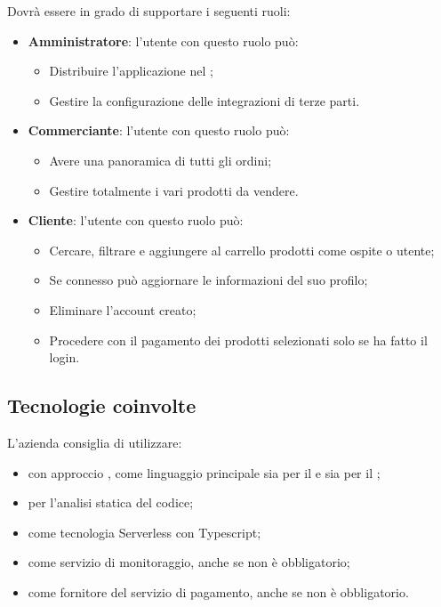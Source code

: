 Dovrà essere in grado di supportare i seguenti ruoli:
\begin{itemize}
	\item \textbf{Amministratore}: l'utente con questo ruolo può:
		\begin{itemize}
			\item Distribuire l'applicazione nel ;
			\item Gestire la configurazione delle integrazioni di terze parti.
		\end{itemize}
	\item \textbf{Commerciante}: l'utente con questo ruolo può:
		\begin{itemize}
			\item Avere una panoramica di tutti gli ordini;
			\item Gestire totalmente i vari prodotti da vendere.
		\end{itemize}
	\item \textbf{Cliente}: l'utente con questo ruolo può:
	\begin{itemize}
		\item Cercare, filtrare e aggiungere al carrello prodotti come ospite o utente;
		\item Se connesso può aggiornare le informazioni del suo profilo;
		\item Eliminare l'account creato;
		\item Procedere con il pagamento dei prodotti selezionati solo se ha fatto il login.
	\end{itemize}
\end{itemize}

\subsection{Tecnologie coinvolte}
L'azienda consiglia di utilizzare:
\begin{itemize}
	\item {} con approccio , come linguaggio principale sia per il  e sia per il ;
	\item {}per l'analisi statica del codice;
	\item {} come tecnologia Serverless con Typescript;
	\item {} come servizio di monitoraggio, anche se non è obbligatorio;
	\item {} come fornitore del servizio di pagamento, anche se non è obbligatorio.
 \end{itemize}

